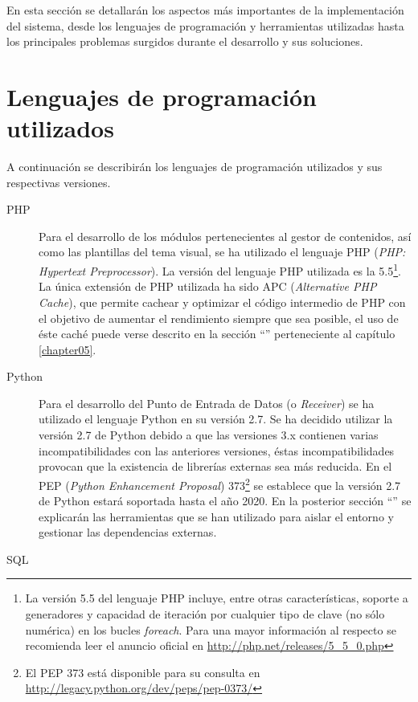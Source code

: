En esta sección se detallarán los aspectos más importantes de la implementación del sistema, desde los lenguajes de programación y herramientas utilizadas hasta los principales problemas surgidos durante el desarrollo y sus soluciones.


\section{Lenguajes de programación utilizados}
\label{implementacion:lenguajes_programacion}
	
	A continuación se describirán los lenguajes de programación utilizados y sus respectivas versiones.
	\begin{description}
		\item[PHP]
			Para el desarrollo de los módulos pertenecientes al gestor de contenidos, así como las plantillas del tema visual, se ha utilizado el lenguaje PHP (\textit{PHP: Hypertext Preprocessor}).  La versión del lenguaje PHP utilizada es la 5.5\footnote{La versión 5.5 del lenguaje PHP incluye, entre otras características, soporte a generadores y capacidad de iteración por cualquier tipo de clave (no sólo numérica) en los bucles \textit{foreach}.  Para una mayor información al respecto se recomienda leer el anuncio oficial en \url{http://php.net/releases/5_5_0.php}}.  La única extensión de PHP utilizada ha sido APC (\textit{Alternative PHP Cache}), que permite cachear y optimizar el código intermedio de PHP con el objetivo de aumentar el rendimiento siempre que sea posible, el uso de éste caché puede verse descrito en la sección ``'' perteneciente al capítulo \ref{chapter05}.
		\item[Python]
			Para el desarrollo del Punto de Entrada de Datos (o \textit{Receiver}) se ha utilizado el lenguaje Python en su versión 2.7. Se ha decidido utilizar la versión 2.7 de Python debido a que las versiones 3.x contienen varias incompatibilidades con las anteriores versiones, éstas incompatibilidades provocan que la existencia de librerías externas sea más reducida.  En el PEP (\textit{Python Enhancement Proposal}) 373\footnote{El PEP 373 está disponible para su consulta en \url{http://legacy.python.org/dev/peps/pep-0373/}} se establece que la versión 2.7 de Python estará soportada hasta el año 2020.  En la posterior sección ``'' se explicarán las herramientas que se han utilizado para aislar el entorno y gestionar las dependencias externas.
		\item[SQL]

\end{description}
